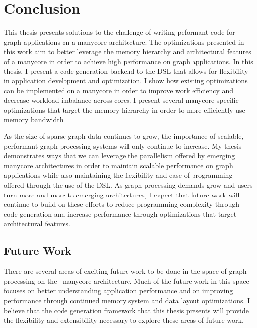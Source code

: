 \chapter{Conclusion}\label{gen:sec:conclusion}

This thesis presents solutions to the challenge of writing peformant code for graph applications on a manycore architecture. 
The optimizations presented in this work aim to better leverage the memory hierarchy and architectural features of a manycore in order to achieve high performance on graph applications. 
In this thesis, I present a code generation backend to the \graphit DSL that allows for flexibility in application development and optimization. 
I show how existing optimizations can be implemented on a manycore in order to improve work efficiency and decrease workload imbalance across cores. 
I present several manycore specific optimizations that target the memory hierarchy in order to more efficiently use memory bandwidth.

As the size of sparse graph data continues to grow, the importance of scalable, performant graph processing systems will only continue to increase. 
My thesis demonstrates ways that we can leverage the parallelism offered by emerging manycore architectures in order to maintain scalable performance on graph applications while also maintaining the flexibility and ease of programming offered through the use of the \graphit DSL. 
As graph processing demands grow and users turn more and more to emerging architectures, I expect that future work will continue to build on these efforts to reduce programming complexity through code generation and increase performance through optimizations that target architectural features. 

\section{Future Work}
There are several areas of exciting future work to be done in the space of graph processing on the \hb~manycore architecture. 
Much of the future work in this space focuses on better understanding application performance and on improving performance through continued memory system and data layout optimizations.
I believe that the code generation framework that this thesis presents will provide the flexibility and extensibility necessary to explore these areas of future work.

